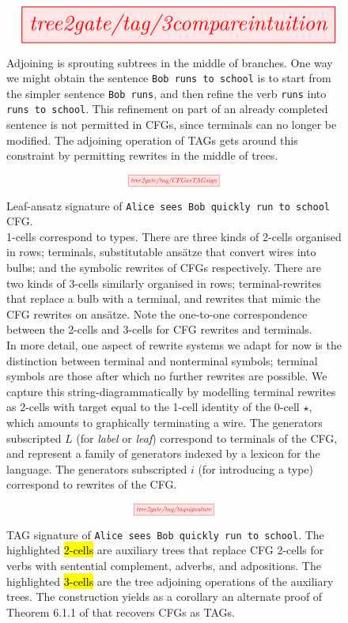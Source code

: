 \begin{figure}
\[\resizebox{0.9\textwidth}{!}{\tikzfig{tree2gate/tag/3compareintuition}}\]
\caption{Adjoining is sprouting subtrees in the middle of branches. One way we might obtain the sentence \texttt{Bob runs to school} is to start from the simpler sentence \texttt{Bob runs}, and then refine the verb \texttt{runs} into \texttt{runs to school}. This refinement on part of an already completed sentence is not permitted in CFGs, since terminals can no longer be modified. The adjoining operation of TAGs gets around this constraint by permitting rewrites in the middle of trees.}
\end{figure}

\begin{figure}[h!]
\[\scalebox{0.6}{\tikzfig{tree2gate/tag/CFGasTAGsign}}\]
\caption{
Leaf-ansatz signature of \texttt{Alice sees Bob quickly run to school} CFG.\\

1-cells correspond to types. There are three kinds of 2-cells organised in rows; terminals, substitutable ans\"{a}tze that convert wires into bulbs; and the symbolic rewrites of CFGs respectively. There are two kinds of 3-cells similarly organised in rows; terminal-rewrites that replace a bulb with a terminal, and rewrites that mimic the CFG rewrites on ans\"{a}tze. Note the one-to-one correspondence between the 2-cells and 3-cells for CFG rewrites and terminals.\\

In more detail, one aspect of rewrite systems we adapt for now is the distinction between terminal and nonterminal symbols; terminal symbols are those after which no further rewrites are possible. We capture this string-diagrammatically by modelling terminal rewrites as 2-cells with target equal to the 1-cell identity of the 0-cell $\star$, which amounts to graphically terminating a wire. The generators subscripted $L$ (for \emph{label} or \emph{leaf}) correspond to terminals of the CFG, and represent a family of generators indexed by a lexicon for the language. The generators subscripted $i$ (for introducing a type) correspond to rewrites of the CFG.
}
\end{figure}

\clearpage

\begin{figure}[h!]
\[\scalebox{0.6}{\tikzfig{tree2gate/tag/tagsignature}}\]
\caption{TAG signature of \texttt{Alice sees Bob quickly run to school}. The highlighted \hl{2-cells} are auxiliary trees that replace CFG 2-cells for verbs with sentential complement, adverbs, and adpositions. The highlighted \hl{3-cells} are the tree adjoining operations of the auxiliary trees. The construction yields as a corollary an alternate proof of Theorem 6.1.1 of \citep{joshiIntroductionTreeAdjoining1987} that recovers CFGs as TAGs.}
\end{figure}

